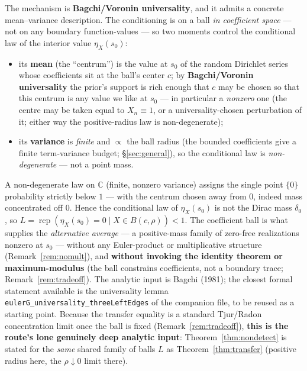 \documentclass[11pt,a4paper]{article}
\theoremstyle{definition}
\newcommand{\etaX}{\eta_X}
\newcommand{\rcp}{\operatorname{rcp}}
\begin{document}
The mechanism is \textbf{Bagchi/Voronin universality}, and it admits a concrete
mean--variance description. The conditioning is on a ball \emph{in coefficient space} --- not
on any boundary function-values --- so two moments control the conditional law of the
interior value \(\etaX(s_0)\):
\begin{itemize}
  \item its \textbf{mean} (the ``centrum'') is the value at \(s_0\) of the random Dirichlet
        series whose coefficients sit at the ball's center \(c\); by \textbf{Bagchi/Voronin
        universality} the prior's support is rich enough that \(c\) may be chosen so that this
        centrum is any value we like at \(s_0\) --- in particular a \emph{nonzero} one (the
        centre may be taken equal to \(X_n\equiv1\), or a universality-chosen perturbation of
        it; either way the positive-radius law is non-degenerate);
  \item its \textbf{variance} is \emph{finite} and \(\propto\) the ball radius (the bounded
        coefficients give a finite term-variance budget; \S\ref{sec:general}), so the
        conditional law is \emph{non-degenerate} --- not a point mass.
\end{itemize}
A non-degenerate law on \(\mathbb{C}\) (finite, nonzero variance) assigns the single point
\(\{0\}\) probability strictly below \(1\) --- with the centrum chosen away from \(0\),
indeed mass concentrated off \(0\). Hence the conditional law of \(\etaX(s_0)\) is not the
Dirac mass \(\delta_0\), so \(L=\rcp(\etaX(s_0)=0\mid X\in B(c,\rho))<1\). The coefficient
ball is what supplies the \emph{alternative average} --- a positive-mass family of zero-free
realizations nonzero at \(s_0\) --- without any Euler-product or multiplicative structure
(Remark~\ref{rem:nomult}), and \textbf{without invoking the identity theorem or
maximum-modulus} (the ball constrains coefficients, not a boundary trace;
Remark~\ref{rem:tradeoff}). The analytic input is Bagchi (1981); the closest formal statement
available is the universality lemma \texttt{eulerG\_universality\_threeLeftEdges} of the
companion file, to be reused as a starting point. Because the transfer equality is a standard
Tjur/Radon concentration limit once the ball is fixed (Remark~\ref{rem:tradeoff}),
\textbf{this is the route's lone genuinely deep analytic input}: Theorem~\ref{thm:nondetect}
is stated for the \emph{same} shared family of balls \(L\) as Theorem~\ref{thm:transfer}
(positive radius here, the \(\rho\downarrow0\) limit there).
\end{document}
